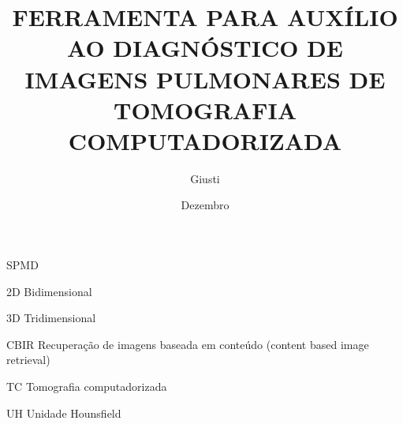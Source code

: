 \documentclass[tc]{texufpel}
\author{Giusti}{Filipe Vernetti}
\title{FERRAMENTA PARA AUXÍLIO AO DIAGNÓSTICO DE IMAGENS PULMONARES DE TOMOGRAFIA COMPUTADORIZADA}
\date{Dezembro}{2008}
\begin{document}
\maketitle

\makeexaminers




\listoffigures
\listoftables

\begin{listofabbrv}{SPMD}
	\item[2D] Bidimensional
	\item[3D] Tridimensional
	\item[CBIR] Recuperação de imagens baseada em conteúdo (content based image retrieval)
	\item[TC] Tomografia computadorizada
	\item[UH] Unidade Hounsfield

\end{listofabbrv}


\tableofcontents










\end{document}
